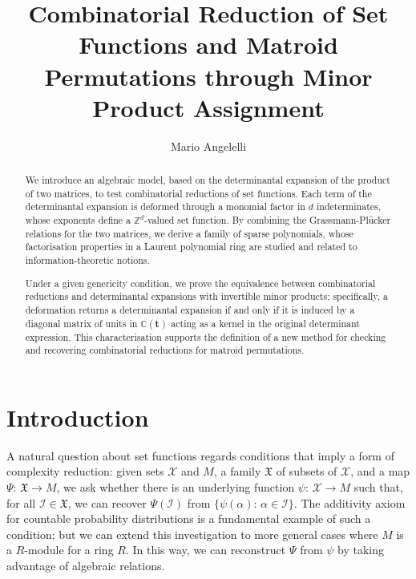 \documentclass[10pt]{article}
\title{Combinatorial Reduction of Set Functions and Matroid Permutations through Minor 
Product Assignment}
\author[1,2]{Mario Angelelli}
\affil[1]{Department of Innovation Engineering, University of Salento, Complesso Ecotekne - Via per Monteroni, Lecce, 73100, Italy}
\affil[2]{INdAM (National Institute of Higher Mathematics) - GNSAGA, Italy}
\date{}
\theoremstyle{remark}%
\theoremstyle{definition}%
\begin{document}
\maketitle 

\begin{abstract}
We introduce an algebraic model, based on the determinantal expansion of the product of two matrices, to test combinatorial reductions of set functions. Each term of the determinantal expansion is deformed through a monomial factor in $d$ indeterminates, whose exponents define a $\mathbb{Z}^{d}$-valued set function. By combining the Grassmann-Pl\"{u}cker relations for the two matrices, we derive a family of sparse polynomials, whose factorisation properties in a Laurent polynomial ring are studied and related to information-theoretic notions. 

Under a given genericity condition, we prove the equivalence between combinatorial reductions and determinantal expansions with invertible minor products; specifically, a deformation returns a determinantal expansion if and only if it is induced by a diagonal matrix of units in $\mathbb{C}(\mathbf{t})$ acting as a kernel in the original determinant expression. This characterisation supports the definition of a new method for checking and recovering combinatorial reductions for matroid permutations. 
\end{abstract}

\section{\label{sec: Introduction} Introduction}

A natural question about set functions regards conditions 
that imply a form of complexity reduction: given sets $\mathcal{X}$ and $M$, a family $\mathfrak{X}$ of subsets of $\mathcal{X}$, and a map $\Psi:\,\mathfrak{X}\longrightarrow M$, we ask whether there is an underlying function $\psi:\,\mathcal{X}\longrightarrow M$ such that, for all $\mathcal{I}\in\mathfrak{X}$, we can recover $\Psi(\mathcal{I})$ from
$\{\psi(\alpha):\,\alpha\in\mathcal{I}\}$. The additivity axiom for countable probability distributions is a fundamental example of such a condition; but we can extend this investigation to more general cases where $M$ is a $R$-module for a ring $R$. In this way, we can reconstruct $\Psi$ from $\psi$ by taking advantage of algebraic relations. 
\end{document}
